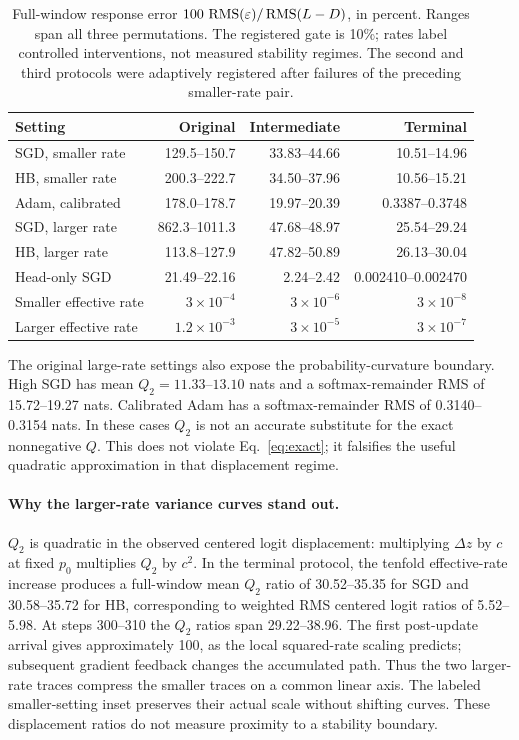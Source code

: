 \begin{table}[t]
\centering
\caption{Full-window response error $100\,\operatorname{RMS}(\varepsilon)/\operatorname{RMS}(L-D)$, in percent.  Ranges span all three permutations.  The registered gate is 10\%; rates label controlled interventions, not measured stability regimes.  The second and third protocols were adaptively registered after failures of the preceding smaller-rate pair.}
\label{tab:rate-validity}
\small
\setlength{\tabcolsep}{5pt}
\begin{tabular}{lrrr}
\toprule
Setting & Original & Intermediate & Terminal\\
\midrule
SGD, smaller rate &129.5--150.7 &33.83--44.66 &10.51--14.96\\
HB, smaller rate &200.3--222.7 &34.50--37.96 &10.56--15.21\\
Adam, calibrated &178.0--178.7 &19.97--20.39 &0.3387--0.3748\\
SGD, larger rate &862.3--1011.3 &47.68--48.97 &25.54--29.24\\
HB, larger rate &113.8--127.9 &47.82--50.89 &26.13--30.04\\
Head-only SGD &21.49--22.16 &2.24--2.42 &0.002410--0.002470\\
\midrule
Smaller effective rate & $3\!\times\!10^{-4}$ & $3\!\times\!10^{-6}$ & $3\!\times\!10^{-8}$\\
Larger effective rate & $1.2\!\times\!10^{-3}$ & $3\!\times\!10^{-5}$ & $3\!\times\!10^{-7}$\\
\bottomrule
\end{tabular}
\end{table}

The original large-rate settings also expose the probability-curvature boundary.  High SGD has mean $Q_2=11.33$--$13.10$ nats and a softmax-remainder RMS of 15.72--19.27 nats.  Calibrated Adam has a softmax-remainder RMS of 0.3140--0.3154 nats.  In these cases $Q_2$ is not an accurate substitute for the exact nonnegative $Q$.  This does not violate Eq.~\eqref{eq:exact}; it falsifies the useful quadratic approximation in that displacement regime.

\paragraph{Why the larger-rate variance curves stand out.}
$Q_2$ is quadratic in the observed centered logit displacement: multiplying $\Delta z$ by $c$ at fixed $p_0$ multiplies $Q_2$ by $c^2$.  In the terminal protocol, the tenfold effective-rate increase produces a full-window mean $Q_2$ ratio of 30.52--35.35 for SGD and 30.58--35.72 for HB, corresponding to weighted RMS centered logit ratios of 5.52--5.98.  At steps 300--310 the $Q_2$ ratios span 29.22--38.96.  The first post-update arrival gives approximately 100, as the local squared-rate scaling predicts; subsequent gradient feedback changes the accumulated path.  Thus the two larger-rate traces compress the smaller traces on a common linear axis.  The labeled smaller-setting inset preserves their actual scale without shifting curves.  These displacement ratios do not measure proximity to a stability boundary.

